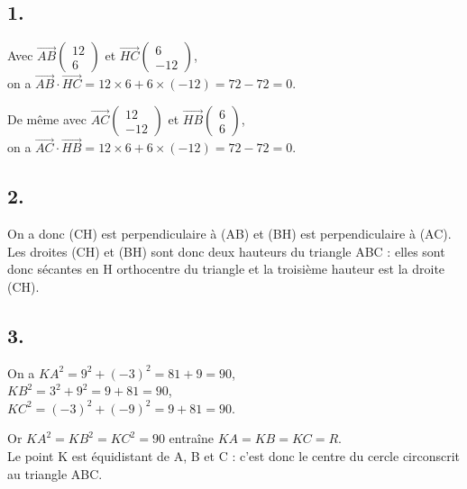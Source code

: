 \subsection*{1.}
	
	Avec \(\overrightarrow{AB} \left( \begin{array}{c} 12 \\ 6 \end{array} \right)\) et \(\overrightarrow{HC} \left( \begin{array}{c} 6 \\ -12 \end{array} \right)\),\\
	 on a \(\overrightarrow{AB} \cdot \overrightarrow{HC} = 12 \times 6 + 6 \times (-12) = 72 - 72 = 0\).
	
	De même avec \(\overrightarrow{AC} \left( \begin{array}{c} 12 \\ -12 \end{array} \right)\) et \(\overrightarrow{HB} \left( \begin{array}{c} 6 \\ 6 \end{array} \right)\), 
	\\on a \(\overrightarrow{AC} \cdot \overrightarrow{HB} = 12 \times 6 + 6 \times (-12) = 72 - 72 = 0\).
	
	\subsection*{2.}
	
	On a donc (CH) est perpendiculaire à (AB) et (BH) est perpendiculaire à (AC). Les droites (CH) et (BH) sont donc deux hauteurs du triangle ABC : elles sont donc sécantes en H orthocentre du triangle et la troisième hauteur est la droite (CH).
	
	\subsection*{3.}
	
	On a \(KA^2 = 9^2 + (-3)^2 = 81 + 9 = 90\),\\
	\(KB^2 = 3^2 + 9^2 = 9 + 81 = 90\),\\
	\(KC^2 = (-3)^2 + (-9)^2 = 9 + 81 = 90\).
	
	Or \(KA^2 = KB^2 = KC^2 = 90\) entraîne \(KA = KB = KC = R\). \\
	Le point K est équidistant de A, B et C : c’est donc le centre du cercle circonscrit au triangle ABC.
	
